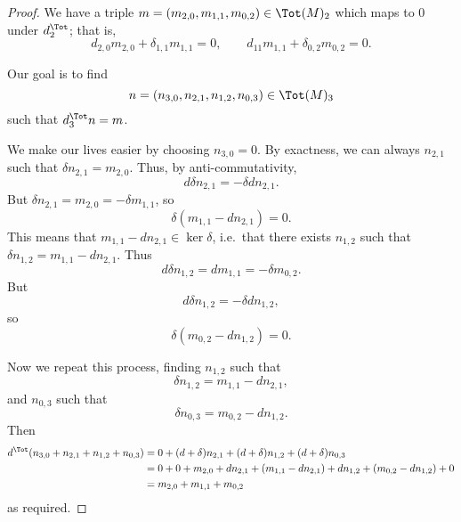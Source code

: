 \documentclass[main.tex]{subfiles}
\begin{document}
\begin{proof}
  We have a triple $m = (m_{2,0}, m_{1,1}, m_{0,2}) \in \Tot(M)_{2}$ which maps to 0 under $d^{\Tot}_{2}$; that is,
  \begin{equation*}
    d_{2,0}m_{2,0} + \delta_{1,1}m_{1,1} = 0,\qquad d_{11} m_{1,1} + \delta_{0,2} m_{0,2} = 0.
  \end{equation*}

  Our goal is to find
  \begin{equation*}
    n = (n_{3,0}, n_{2,1}, n_{1,2}, n_{0,3}) \in \Tot(M)_{3}
  \end{equation*}
  such that $d^{\Tot}_{3}n = m$.

  We make our lives easier by choosing $n_{3,0} = 0$. By exactness, we can always $n_{2,1}$ such that $\delta n_{2,1} = m_{2,0}$. Thus, by anti-commutativity,
  \begin{equation*}
    d \delta n_{2,1} = -\delta d n_{2,1}.
  \end{equation*}
  But $\delta n_{2,1} = m_{2,0} = -\delta m_{1,1}$, so
  \begin{equation*}
    \delta(m_{1,1} - d n_{2,1}) = 0.
  \end{equation*}
  This means that $m_{1,1} - dn_{2,1} \in \ker \delta$, i.e.\ that there exists $n_{1,2}$ such that $\delta n_{1,2} = m_{1,1} - dn_{2,1}$. Thus
  \begin{equation*}
    d \delta n_{1,2} = d m_{1,1} = -\delta m_{0,2}.
  \end{equation*}
  But
  \begin{equation*}
    d \delta n_{1,2} = -\delta d n_{1,2},
  \end{equation*}
  so
  \begin{equation*}
    \delta(m_{0,2} - d n_{1,2}) = 0.
  \end{equation*}

  Now we repeat this process, finding $n_{1,2}$ such that
  \begin{equation*}
    \delta n_{1,2} = m_{1,1} - d n_{2,1},
  \end{equation*}
  and $n_{0,3}$ such that
  \begin{equation*}
    \delta n_{0,3} = m_{0,2} - d n_{1,2}.
  \end{equation*}
  Then
  \begin{align*}
    d^{\Tot}(n_{3,0} + n_{2,1} + n_{1,2} + n_{0,3}) &= 0 + (d + \delta) n_{2,1} + (d + \delta)n_{1,2} + (d + \delta) n_{0,3} \\
    &= 0 + 0 + m_{2,0} + d n_{2,1} + (m_{1,1} - dn_{2,1}) + d n_{1,2} + (m_{0,2} - d n_{1,2}) + 0 \\
    &= m_{2,0} + m_{1,1} + m_{0,2}
  \end{align*}
  as required.
\end{proof}
\end{document}
